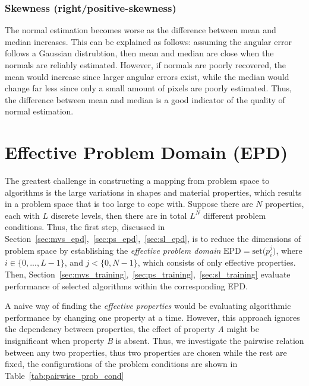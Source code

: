 \subsubsection{Skewness (right/positive-skewness)}
The normal estimation becomes worse as the difference between mean and median increases. This can be explained as follows: assuming the angular error follows a Gaussian distrubtion, then mean and median are close when the normals are reliably estimated. However, if normals are poorly recovered, the mean would increase since larger angular errors exist, while the median would change far less since only a small amount of pixels are poorly estimated. Thus, the difference between mean and median is a good indicator of the quality of normal estimation.

\section{Effective Problem Domain (EPD)}
The greatest challenge in constructing a mapping from problem space to algorithms is the large variations in shapes and material properties, which results in a problem space that is too large to cope with. Suppose there are $N$ properties, each with $L$ discrete levels, then there are in total $L^N$ different problem conditions. Thus, the first step, discussed in Section~\ref{sec:mvs_epd},~\ref{sec:ps_epd},~\ref{sec:sl_epd}, is to reduce the dimensions of problem space by establishing the \textit{effective problem domain} $\text{EPD}=\text{set(}p_i^j\text{)}$, where $i\in\{0, ..., L-1\}$, and $j<\{0, N-1\}$, which consists of only effective properties. Then, Section~\ref{sec:mvs_training},~\ref{sec:ps_training},~\ref{sec:sl_training} evaluate performance of selected algorithms within the corresponding EPD.

A naive way of finding the \textit{effective properties} would be evaluating algorithmic performance by changing one property at a time. However, this approach ignores the dependency between properties, \ie the effect of property \textit{A} might be insignificant when property \textit{B} is absent. Thus, we investigate the pairwise relation between any two properties, thus two properties are chosen while the rest are fixed, the configurations of the problem conditions are shown in Table~\ref{tab:pairwise_prob_cond}

